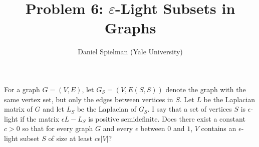 

\title{Problem 6: $\varepsilon$-Light Subsets in Graphs}
\author{Daniel Spielman (Yale University)}
\date{}


\maketitle

For a graph $G = (V, E)$, let $G_S = (V, E(S,S))$ denote the graph with the same vertex set, but only the edges between vertices in $S$. Let $L$ be the Laplacian matrix of $G$ and let $L_S$ be the Laplacian of $G_S$. I say that a set of vertices $S$ is $\epsilon$-light if the matrix $\epsilon L - L_S$ is positive semidefinite. Does there exist a constant $c > 0$ so that for every graph $G$ and every $\epsilon$ between $0$ and $1$, $V$ contains an $\epsilon$-light subset $S$ of size at least $c \epsilon |V|$?


